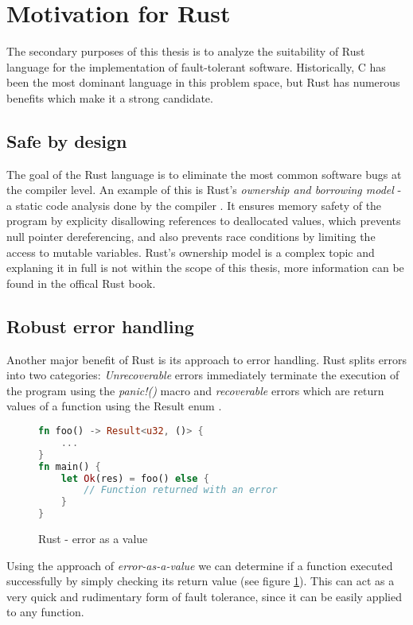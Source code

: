 \section{Motivation for Rust}
The secondary purposes of this thesis is to analyze the suitability of Rust language for the implementation of fault-tolerant software. Historically, C has been the most dominant language in this problem space, but Rust has numerous benefits which make it a strong candidate.

\subsection{Safe by design}
The goal of the Rust language is to eliminate the most common software bugs at the compiler level. An example of this is Rust's \textit{ownership and borrowing model} - a static code analysis done by the compiler \cite{rust_book:ownership}. It ensures memory safety of the program by explicity disallowing references to deallocated values, which prevents null pointer dereferencing, and also prevents race conditions by limiting the access to mutable variables. Rust's ownership model is a complex topic and explaning it in full is not within the scope of this thesis, more information can be found in the offical Rust book.

\subsection{Robust error handling}
Another major benefit of Rust is its approach to error handling. Rust splits errors into two categories: \textit{Unrecoverable} errors immediately terminate the execution of the program using the \textit{panic!()} macro and \textit{recoverable} errors which are return values of a function using the Result enum \cite{rust_book:error_handling}.

\begin{figure}[!h]
\begin{lstlisting}[language=Rust]
fn foo() -> Result<u32, ()> {
    ...
}
fn main() {
    let Ok(res) = foo() else {
        // Function returned with an error
    }
}
\end{lstlisting}
\caption{Rust - error as a value}
\label{fig:rust_error}
\end{figure}

Using the approach of \textit{error-as-a-value} we can determine if a function executed successfully by simply checking its return value (see figure \ref{fig:rust_error}). This can act as a very quick and rudimentary form of fault tolerance, since it can be easily applied to any function.

